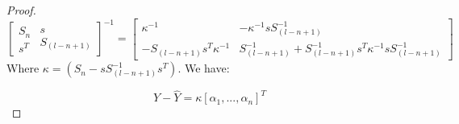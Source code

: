 \begin{proof}
	\begin{equation}%
	{\left[ {\begin{array}{*{20}{c}}
			{{S_n}}\\
			{{s^T}}
			\end{array}\begin{array}{*{20}{c}}
			s\\
			{{S_{(l - n + 1)}}}
			\end{array}} \right]^{ - 1}} = \left[ {\begin{array}{*{20}{c}}
		{{\kappa ^{ - 1}}}&{ - {\kappa ^{ - 1}}sS_{(l - n + 1)}^{ - 1}}\\
		{ - {S_{(l - n + 1)}}{s^T}{\kappa ^{ - 1}}}&{S_{(l - n + 1)}^{ - 1} + S_{(l - n + 1)}^{ - 1}{s^T}{\kappa ^{ - 1}}sS_{(l - n + 1)}^{ - 1}}
		\end{array}} \right]
	\end{equation}
	Where $\kappa  = \left( {{S_n} - sS_{(l - n + 1)}^{ - 1}{s^T}} \right)$. We have:
	
	\begin{equation}%
	Y - \hat Y = {\kappa}{\left[ {{\alpha _1},...,{\alpha _n}} \right]^T}
	\end{equation}
\end{proof}